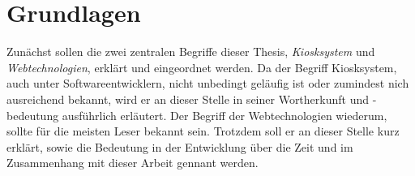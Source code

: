 \chapter{Grundlagen}
\label{chapter:grundlagen}

Zunächst sollen die zwei zentralen Begriffe dieser Thesis, \emph{Kiosksystem} und
\emph{Webtechnologien}, erklärt und eingeordnet werden. Da der Begriff
Kiosksystem, auch unter Softwareentwicklern, nicht unbedingt geläufig ist oder
zumindest nich ausreichend bekannt, wird er an dieser Stelle in seiner Wortherkunft
und -bedeutung ausführlich erläutert. Der Begriff der Webtechnologien wiederum, sollte
für die meisten Leser bekannt sein. Trotzdem soll er an dieser Stelle kurz erklärt, sowie
die Bedeutung in der Entwicklung über die Zeit und im Zusammenhang mit dieser Arbeit gennant werden.


